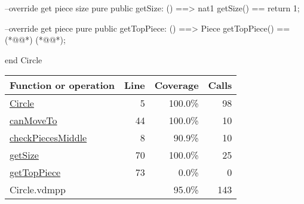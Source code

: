 \begin{vdmpp}[breaklines=true]
  --override get piece size
  pure public getSize: () ==> nat1
  getSize() == return 1;
  
  --override get piece
  pure public getTopPiece: () ==> Piece
  getTopPiece() == (*@@*) (*@@*);
  
end Circle
\end{vdmpp}
\bigskip
\begin{longtable}{|l|r|r|r|}
\hline
Function or operation & Line & Coverage & Calls \\
\hline
\hline
\hyperref[Circle:5]{Circle} & 5&100.0\% & 98 \\
\hline
\hyperref[canMoveTo:44]{canMoveTo} & 44&100.0\% & 10 \\
\hline
\hyperref[checkPiecesMiddle:8]{checkPiecesMiddle} & 8&90.9\% & 10 \\
\hline
\hyperref[getSize:70]{getSize} & 70&100.0\% & 25 \\
\hline
\hyperref[getTopPiece:73]{getTopPiece} & 73&0.0\% & 0 \\
\hline
\hline
Circle.vdmpp & & 95.0\% & 143 \\
\hline
\end{longtable}

